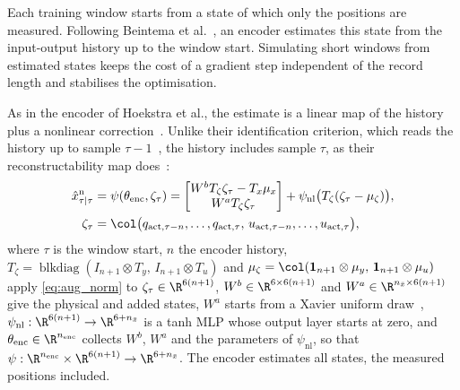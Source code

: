 Each training window starts from a state of which only the positions are
measured.
Following Beintema et al.~\cite[Secs.~2, 3]{beintema2023subnet}, an encoder
estimates this state from the input-output history up to the window start.
Simulating short windows from estimated states keeps the cost of a gradient
step independent of the record length and stabilises the optimisation.

As in the encoder of Hoekstra et al., the estimate is a linear map of the
history plus a nonlinear correction~\cite[Eq.~(8)]{hoekstra2026encoder}.
Unlike their identification criterion, which reads the history up to sample
$\tau-1$~\cite[Eq.~(22e)]{hoekstra2026lfr}, the history includes sample $\tau$,
as their reconstructability map does~\cite[Eqs.~(11) to~(17)]{hoekstra2026encoder}:
{\small
\begin{equation}
\begin{aligned}
 \hat x^{\mathrm n}_{\tau|\tau}
 &=\psi(\theta_{\mathrm{enc}},\zeta_\tau)
 =\begin{bmatrix}W^bT_\zeta\zeta_\tau-T_x\mu_x\\ W^aT_\zeta\zeta_\tau\end{bmatrix}
  +\psi_{\mathrm{nl}}\bigl(T_\zeta(\zeta_\tau-\mu_\zeta)\bigr),\\
 \zeta_\tau
 &=\col\bigl(q_{\mathrm{act},\tau-n},\dots,q_{\mathrm{act},\tau},\,
   u_{\mathrm{act},\tau-n},\dots,u_{\mathrm{act},\tau}\bigr),
\end{aligned}
\label{eq:aug_encoder}
\end{equation}
}
where $\tau$ is the window start, $n$ the encoder history,
$T_\zeta=\operatorname{blkdiag}(I_{n+1}\otimes T_y,\,I_{n+1}\otimes T_u)$ and
$\mu_\zeta=\col(\mathbf 1_{n+1}\otimes\mu_y,\,\mathbf 1_{n+1}\otimes\mu_u)$
apply \eqref{eq:aug_norm} to $\zeta_\tau\in\R^{6(n+1)}$,
$W^b\in\R^{6\times6(n+1)}$ and $W^a\in\R^{n_{\bar x}\times6(n+1)}$ give the
physical and added states, $W^a$ starts from a Xavier uniform
draw~\cite[Eq.~(31)]{hoekstra2026lfr},
$\psi_{\mathrm{nl}}:\R^{6(n+1)}\to\R^{6+n_{\bar x}}$ is a tanh MLP whose
output layer starts at zero, and $\theta_{\mathrm{enc}}\in\R^{n_{\mathrm{enc}}}$
collects $W^b$, $W^a$ and the parameters of $\psi_{\mathrm{nl}}$, so that
$\psi:\R^{n_{\mathrm{enc}}}\times\R^{6(n+1)}\to\R^{6+n_{\bar x}}$.
The encoder estimates all states, the measured positions included.

